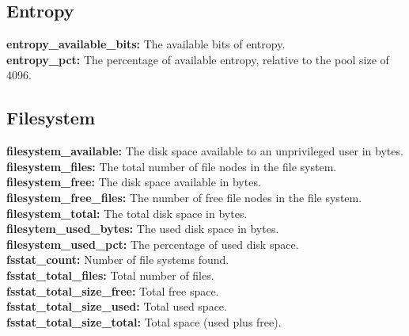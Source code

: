 \documentclass{iosart2c}
\begin{document}
\subsection{Entropy}

\textbf{entropy\_available\_bits:} The available bits of entropy.\\

\textbf{entropy\_pct:} The percentage of available entropy, relative to the pool size of 4096.\\



\subsection{Filesystem}

\textbf{filesystem\_available:} The disk space available to an unprivileged user in bytes.\\

\textbf{filesystem\_files:} The total number of file nodes in the file system.\\

\textbf{filesystem\_free:} The disk space available in bytes.\\

\textbf{filesystem\_free\_files:} The number of free file nodes in the file system.\\

\textbf{filesystem\_total:} The total disk space in bytes.\\

\textbf{filesytem\_used\_bytes:} The used disk space in bytes.\\

\textbf{filesystem\_used\_pct:} The percentage of used disk space.\\

\textbf{fsstat\_count:} Number of file systems found.\\

\textbf{fsstat\_total\_files:} Total number of files.\\

\textbf{fsstat\_total\_size\_free:} Total free space.\\

\textbf{fsstat\_total\_size\_used:} Total used space.\\

\textbf{fsstat\_total\_size\_total:} Total space (used plus free).\\
\end{document}
